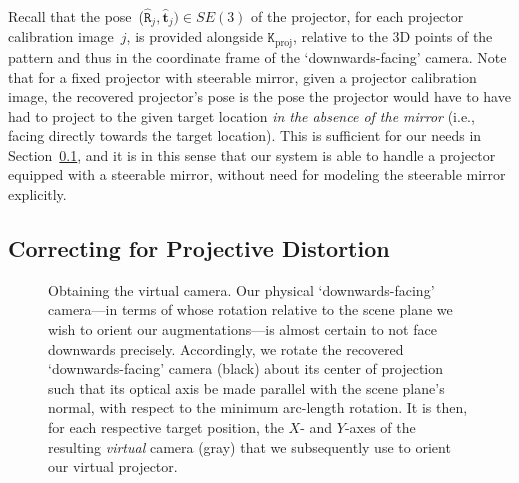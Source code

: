 \documentclass[review]{elsarticle}
\begin{document}
Recall that the pose~($\hat{\mathtt{R}}_j, \hat{\mathbf{t}}_j) \in SE(3)$ of the projector, for each projector calibration image~$j$, is provided alongside $\mathtt{K}_\text{proj}$, relative to the 3D points of the pattern and thus in the coordinate frame of the `downwards-facing' camera. Note that for a fixed projector with steerable mirror, given a projector calibration image, the recovered projector's pose is the pose the projector would have to have had to project to the given target location \textit{in the absence of the mirror} (i.e., facing directly towards the target location). This is sufficient for our needs in Section~\ref{sec:approach:homography}, and it is in this sense that our system is able to handle a projector equipped with a steerable mirror, without need for modeling the steerable mirror explicitly.

\subsection{Correcting for Projective Distortion}\label{sec:approach:homography}

\begin{figure}
    \centering
    \qquad
    \caption{Obtaining the virtual camera. Our physical `downwards-facing' camera---in terms of whose rotation relative to the scene plane we wish to orient our augmentations---is almost certain to not face downwards precisely. Accordingly, we rotate the recovered `downwards-facing' camera (black) about its center of projection such that its optical axis be made parallel with the scene plane's normal, with respect to the minimum arc-length rotation. It is then, for each respective target position, the $X$- and $Y$-axes of the resulting \textit{virtual} camera (gray) that we subsequently use to orient our virtual projector.} %
    \label{fig:virtualcam}
\end{figure} 
\end{document}
